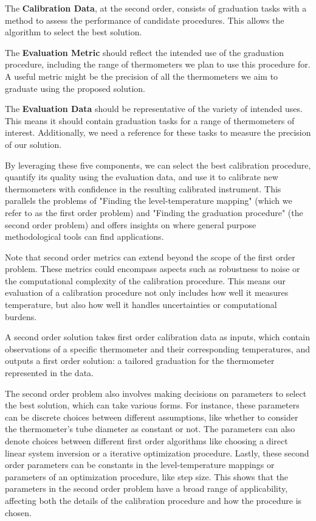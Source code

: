 \begin{bibunit}
The \textbf{Calibration Data}, at the second order, consists of graduation tasks with a method to assess the performance of candidate procedures. This allows the algorithm to select the best solution.

The \textbf{Evaluation Metric} should reflect the intended use of the graduation procedure, including the range of thermometers we plan to use this procedure for. A useful metric might be the precision of all the thermometers we aim to graduate using the proposed solution.

The \textbf{Evaluation Data} should be representative of the variety of intended uses. This means it should contain graduation tasks for a range of thermometers of interest. Additionally, we need a reference for these tasks to measure the precision of our solution.

By leveraging these five components, we can select the best calibration procedure, quantify its quality using the evaluation data, and use it to calibrate new thermometers with confidence in the resulting calibrated instrument. This parallels the problems of "Finding the level-temperature mapping" (which we refer to as the first order problem) and "Finding the graduation procedure" (the second order problem) and offers insights on where general purpose methodological tools can find applications.

Note that second order metrics can extend beyond the scope of the first order problem. These metrics could encompass aspects such as robustness to noise or the computational complexity of the calibration procedure. This means our evaluation of a calibration procedure not only includes how well it measures temperature, but also how well it handles uncertainties or computational burdens.

A second order solution takes first order calibration data as inputs, which contain observations of a specific thermometer and their corresponding temperatures, and outputs a first order solution: a tailored graduation for the thermometer represented in the data.

The second order problem also involves making decisions on parameters to select the best solution, which can take various forms. For instance, these parameters can be discrete choices between different assumptions, like whether to consider the thermometer's tube diameter as constant or not. The parameters can also denote choices between different first order algorithms like choosing a direct linear system inversion or a iterative optimization procedure. Lastly, these second order parameters can be constants in the level-temperature mappings or parameters of an optimization procedure, like step size. This shows that the parameters in the second order problem have a broad range of applicability, affecting both the details of the calibration procedure and how the procedure is chosen.


\end{bibunit}
